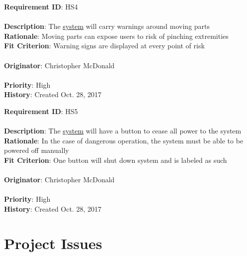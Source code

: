 \documentclass[11pt]{article}
\begin{document}
\begin{framed}
	\noindent\textbf{Requirement ID}: HS4 \hfill\\\\
	\noindent\textbf{Description}: The \hyperref[sec:definitions]{system} will carry warnings around moving parts  \\
	\textbf{Rationale}: Moving parts can expose users to risk of pinching extremities \\
	\textbf{Fit Criterion}: Warning signs are displayed at every point of risk \\\\
	\textbf{Originator}: Christopher McDonald \\\\
	\textbf{Priority}: High \hfill \\
	\noindent\textbf{History}: Created Oct. 28, 2017
\end{framed}

\begin{framed}
	\noindent\textbf{Requirement ID}: HS5 \hfill\\\\
	\noindent\textbf{Description}: The \hyperref[sec:definitions]{system} will have a button to cease all power to the system \\
	\textbf{Rationale}: In the case of dangerous operation, the system must be able to be powered off manually \\
	\textbf{Fit Criterion}: One button will shut down system and is labeled as such \\\\
	\textbf{Originator}: Christopher McDonald \\\\
	\textbf{Priority}: High \hfill \\
	\noindent\textbf{History}: Created Oct. 28, 2017
\end{framed}

\section{Project Issues}
\end{document}
